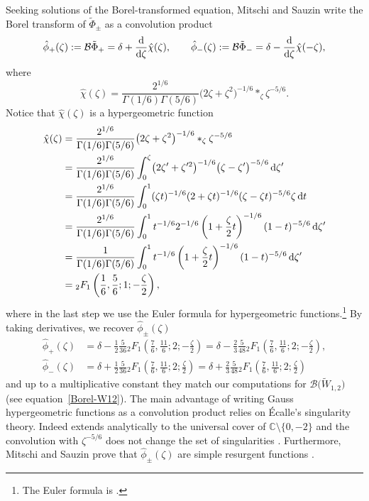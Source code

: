 \documentclass[pdftex]{sigma}
\newcommand{\C}{\mathbb{C}}
\newcommand{\series}[1]{\tilde{#1}}
\newcommand{\borel}{\mathcal{B}}
\numberwithin{equation}{section}
\begin{document}
Seeking solutions of the Borel-transformed equation, Mitschi and Sauzin write the Borel transform of $\series{\Phi}_{\pm}$ as a convolution product
\begin{align*}
\hat{\phi}_+(\zeta):=\borel\series{\Phi}_+=\delta+\frac{\rm d}{{\rm d}\zeta}\hat{\chi}(\zeta), \qquad \hat{\phi}_-(\zeta):=\borel\series{\Phi}_-=\delta-\frac{\rm d}{{\rm d}\zeta}\hat{\chi}(-\zeta),
\end{align*}
 where
\[
\hat{\chi}(\zeta)=\frac{2^{1/6}}{\Gamma(1/6)\Gamma(5/6)}\bigl(2\zeta+\zeta^2\bigr)^{-1/6} \ast_\zeta \zeta^{-5/6}.
\]
Notice that $\hat{\chi}(\zeta)$ is a hypergeometric function
\begin{align*}
\hat{\chi}(\zeta)&=\frac{2^{1/6}}{\Gamma(1/6)\Gamma(5/6)}\bigl(2\zeta+\zeta^2\bigr)^{-1/6}\ast_\zeta \zeta^{-5/6}\\
&=\frac{2^{1/6}}{\Gamma(1/6)\Gamma(5/6)}\int_0^{\zeta}\bigl(2\zeta'+\zeta'^2\bigr)^{-1/6} \bigl(\zeta-\zeta'\bigr)^{-5/6}\,{\rm d}\zeta'\\
&=\frac{2^{1/6}}{\Gamma(1/6)\Gamma(5/6)}\int_0^{1}(\zeta t)^{-1/6}(2+\zeta t)^{-1/6} (\zeta-\zeta t)^{-5/6} \zeta \,{\rm d}t\\
&=\frac{2^{1/6}}{\Gamma(1/6)\Gamma(5/6)}\int_0^{1} t^{-1/6} 2^{-1/6}\left(1+\frac{\zeta}{2} t\right)^{-1/6} (1-t)^{-5/6}\,{\rm d}\zeta'\\
&=\frac{1}{\Gamma(1/6)\Gamma(5/6)}\int_0^{1} t^{-1/6} \left(1+\frac{\zeta}{2} t\right)^{-1/6} (1-t)^{-5/6}\,{\rm d}\zeta'\\
&={}_2F_1\left(\frac{1}{6},\frac{5}{6};1;-\frac{\zeta}{2}\right),
\end{align*}
where in the last step we use the Euler formula for hypergeometric functions.\footnote{The Euler formula is .
}
By taking derivatives, we recover $\hat{\phi}_{\pm}(\zeta)$
\begin{align*}
\hat{\phi}_+(\zeta)&=\delta-\frac{1}{2}\frac{5}{36} {}_2F_1\left(\frac{7}{6},\frac{11}{6};2;-\frac{\zeta}{2}\right)=\delta-\frac{2}{3}\frac{5}{48} {}_2F_1\left(\frac{7}{6},\frac{11}{6};2;-\frac{\zeta}{2}\right),\\
\hat{\phi}_-(\zeta)&=\delta+\frac{1}{2}\frac{5}{36} {}_2F_1\left(\frac{7}{6},\frac{11}{6};2;\frac{\zeta}{2}\right)=\delta+\frac{2}{3}\frac{5}{48} {}_2F_1\left(\frac{7}{6},\frac{11}{6};2;\frac{\zeta}{2}\right)
\end{align*}
and up to a multiplicative constant they match our computations for $\borel\bigl(\tilde{W}_{1,2}\bigr)$ (see equation~\eqref{Borel-W12}).
The main advantage of writing Gauss hypergeometric functions as a convolution product relies on \'Ecalle's singularity theory. Indeed  extends analytically to the universal cover of $\C\setminus\lbrace 0,-2\rbrace$ and the convolution with $\zeta^{-5/6}$ does not change the set of singularities \cite[Section~6.14.5\,(c)]{diverg-resurg-i}. Furthermore, Mitschi and Sauzin prove that $\hat{\phi}_{\pm}(\zeta)$ are simple resurgent functions \cite[Lemma 6.106]{diverg-resurg-i}.
%
\end{document}
